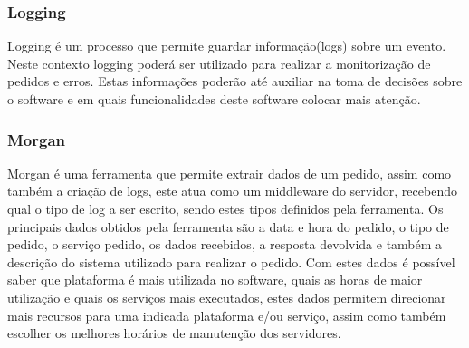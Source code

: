 \subsubsection{Logging}
Logging é um processo que permite guardar informação(logs) sobre um evento. Neste contexto logging poderá ser utilizado para realizar a monitorização de pedidos e erros. Estas informações poderão até auxiliar na toma de decisões sobre o software e em quais funcionalidades deste software colocar mais atenção.

\subsubsection{Morgan}

Morgan é uma ferramenta que permite extrair dados de um pedido, assim como também a criação de logs, este atua como um middleware do servidor, recebendo qual o tipo de log a ser escrito, sendo estes tipos definidos pela ferramenta. Os principais dados obtidos pela ferramenta são a data e hora do pedido, o tipo de pedido, o serviço pedido, os dados recebidos, a resposta devolvida e também a descrição do sistema utilizado para realizar o pedido. Com estes dados é possível saber que plataforma é mais utilizada no software, quais as horas de maior utilização e quais os serviços mais executados, estes dados permitem direcionar mais recursos para uma indicada plataforma e/ou serviço, assim como também escolher os melhores horários de manutenção dos servidores.